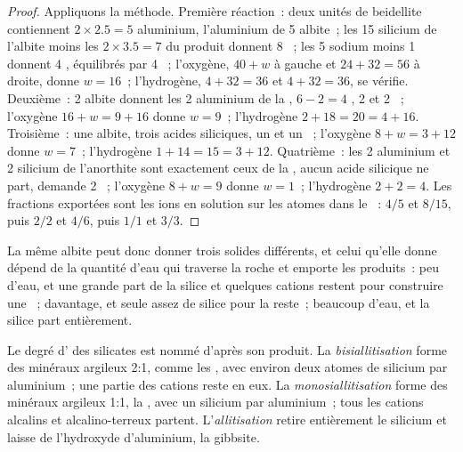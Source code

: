 \begin{proof}
Appliquons la méthode. Première réaction~: deux unités de beidellite contiennent $2\times2.5 = 5$
aluminium, l'aluminium de 5 albite~; les 15 silicium de l'albite moins les
$2\times3.5 = 7$ du produit donnent 8 ~; les 5 sodium moins 1 donnent
4 , équilibrés par 4 ~; l'oxygène, $40 + w$ à gauche et $24 + 32 =
56$ à droite, donne $w = 16$~; l'hydrogène, $4 + 32 = 36$ et $4 + 32 = 36$,
se vérifie. Deuxième~: 2 albite donnent les 2 aluminium de la , $6 - 2 = 4$
, 2  et 2 ~; l'oxygène $16 + w = 9 + 16$ donne $w = 9$~;
l'hydrogène $2 + 18 = 20 = 4 + 16$. Troisième~: une albite, trois acides siliciques, un
 et un ~; l'oxygène $8 + w = 3 + 12$ donne $w = 7$~; l'hydrogène
$1 + 14 = 15 = 3 + 12$. Quatrième~: les 2 aluminium et 2 silicium de l'anorthite sont
exactement ceux de la , aucun acide silicique ne part,  demande 2 ~;
l'oxygène $8 + w = 9$ donne $w = 1$~; l'hydrogène $2 + 2 = 4$. Les fractions
exportées sont les ions en solution sur les atomes dans le ~: $4/5$ et $8/15$, puis
$2/2$ et $4/6$, puis $1/1$ et $3/3$.
\end{proof}

La même albite peut donc donner trois solides différents, et celui qu'elle donne
dépend de la quantité d'eau qui traverse la roche et emporte les produits~:
peu d'eau, et une grande part de la silice et quelques cations restent pour
construire une ~; davantage, et seule assez de silice pour la  reste~; beaucoup
d'eau, et la silice part entièrement.

\begin{definition}\label{def:b1:weathering-clays:hydrolysis-degree}
Le degré d' des silicates est nommé d'après son produit.
La \emph{bisiallitisation} forme des minéraux argileux 2:1, comme les
, avec environ deux atomes de silicium par aluminium~; une partie des cations
reste en eux. La \emph{monosiallitisation} forme des
minéraux argileux 1:1, la , avec un silicium par aluminium~; tous les cations alcalins et
alcalino-terreux partent. L'\emph{allitisation} retire
entièrement le silicium et laisse de l'hydroxyde d'aluminium, la gibbsite.
\end{definition}

